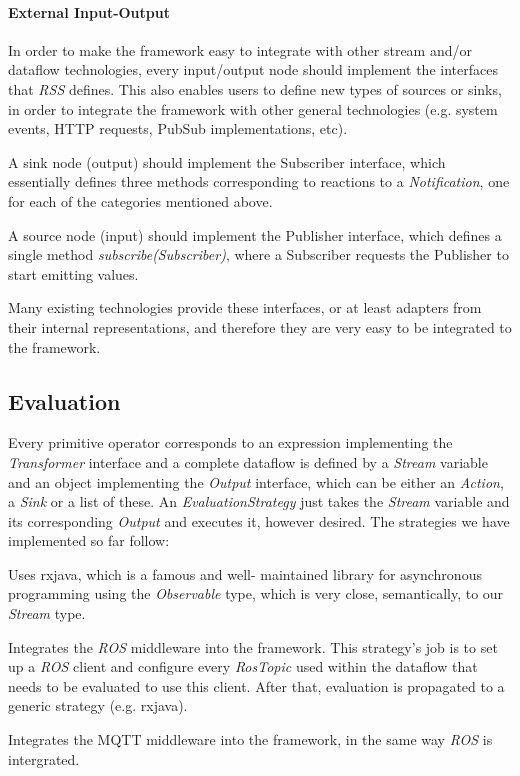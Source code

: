 \documentclass[sigplan,review,anonymous]{acmart}
\begin{document}
\paragraph{External Input-Output}
In order to make the framework easy to integrate with other stream and/or
dataflow technologies, every input/output node should implement the
interfaces that \textit{RSS} defines. This also enables users to define new
types of sources or sinks, in order to integrate the framework with other
general technologies (e.g. system events, HTTP requests, PubSub implementations,
etc).

A sink node (output) should implement the Subscriber interface, which
essentially defines three methods corresponding to reactions to a
\textit{Notification}, one for each of the categories mentioned above.

A source node (input) should implement the Publisher interface, which defines a
single method \textit{subscribe(Subscriber)}, where a Subscriber requests the
Publisher to start emitting values.

Many existing technologies provide these interfaces, or at least adapters from
their internal representations, and therefore they are very easy to be
integrated to the framework.

\subsection{Evaluation}

Every primitive operator corresponds to an expression implementing the
\textit{Transformer} interface and a complete dataflow is defined by a
\textit{Stream} variable and an object implementing the \textit{Output} interface,
which can be either an \textit{Action}, a \textit{Sink} or a list of these.
An \textit{EvaluationStrategy} just takes the \textit{Stream} variable and its
corresponding \textit{Output} and executes it, however desired.
The strategies we have implemented so far follow:
\begin{description}[style=nextline]
\item[RxJavaEvaluationStrategy] Uses
rxjava, which is a famous and well-
maintained library for asynchronous programming using the \textit{Observable}
type, which is very close, semantically, to our \textit{Stream} type.

\item[RosEvaluationStrategy] Integrates the \textit{ROS} middleware into the
framework. This strategy's job is to set up a \textit{ROS} client and configure every
\textit{RosTopic} used within the dataflow that needs to be evaluated to use
this client. After that, evaluation is propagated to a generic strategy (e.g.
rxjava).

\item[MqttEvaluationStrategy] Integrates the MQTT middleware into the framework,
in the same way \textit{ROS} is intergrated. \end{description}
\end{document}
